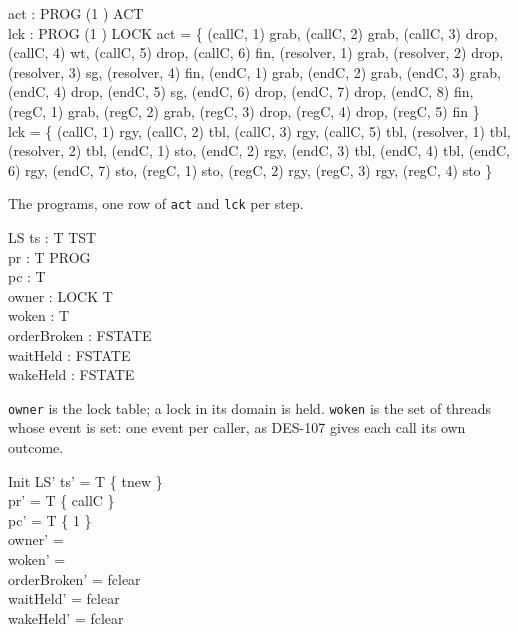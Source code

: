 \documentclass[a4paper,10pt,fleqn]{article}
\begin{document}
\begin{axdef}
  act : PROG \cross (1 ) \pfun ACT \\
  lck : PROG \cross (1 ) \pfun LOCK
\where
  act = \{ (callC, 1) \mapsto grab, (callC, 2) \mapsto grab,
    (callC, 3) \mapsto drop, (callC, 4) \mapsto wt, (callC, 5) \mapsto drop,
    (callC, 6) \mapsto fin,
    (resolver, 1) \mapsto grab, (resolver, 2) \mapsto drop,
    (resolver, 3) \mapsto sg, (resolver, 4) \mapsto fin,
    (endC, 1) \mapsto grab, (endC, 2) \mapsto grab, (endC, 3) \mapsto grab,
    (endC, 4) \mapsto drop, (endC, 5) \mapsto sg, (endC, 6) \mapsto drop,
    (endC, 7) \mapsto drop, (endC, 8) \mapsto fin,
    (regC, 1) \mapsto grab, (regC, 2) \mapsto grab, (regC, 3) \mapsto drop,
    (regC, 4) \mapsto drop, (regC, 5) \mapsto fin \} \\
  lck = \{ (callC, 1) \mapsto rgy, (callC, 2) \mapsto tbl,
    (callC, 3) \mapsto rgy, (callC, 5) \mapsto tbl,
    (resolver, 1) \mapsto tbl, (resolver, 2) \mapsto tbl,
    (endC, 1) \mapsto sto, (endC, 2) \mapsto rgy, (endC, 3) \mapsto tbl,
    (endC, 4) \mapsto tbl, (endC, 6) \mapsto rgy, (endC, 7) \mapsto sto,
    (regC, 1) \mapsto sto, (regC, 2) \mapsto rgy, (regC, 3) \mapsto rgy,
    (regC, 4) \mapsto sto \}
\end{axdef}

The programs, one row of \texttt{act} and \texttt{lck} per step.

\begin{schema}{LS}
  ts : T \fun TST \\
  pr : T \fun PROG \\
  pc : T   \\
  owner : LOCK \pfun T \\
  woken : \power T \\
  orderBroken : FSTATE \\
  waitHeld : FSTATE \\
  wakeHeld : FSTATE
\end{schema}

\texttt{owner} is the lock table; a lock in its domain is held.
\texttt{woken} is the set of threads whose event is set: one event per
caller, as DES-107 gives each call its own outcome.

\begin{schema}{Init}
  LS'
\where
  ts' = T \cross \{ tnew \} \\
  pr' = T \cross \{ callC \} \\
  pc' = T \cross \{ 1 \} \\
  owner' = \emptyset \\
  woken' = \emptyset \\
  orderBroken' = fclear \\
  waitHeld' = fclear \\
  wakeHeld' = fclear
\end{schema}
\end{document}

